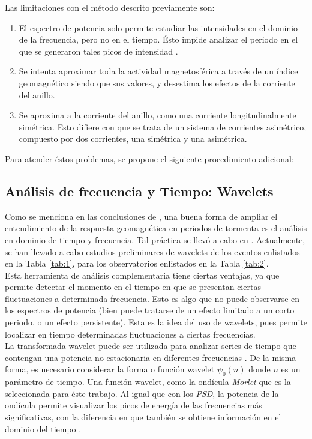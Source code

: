 \documentclass[preprint,12pt]{article}
\begin{document}
Las limitaciones con el método descrito previamente son: 

\begin{enumerate}
	\item El espectro de potencia solo permite estudiar las intensidades en el dominio de la frecuencia, pero no en el tiempo. Ésto impide analizar el periodo en el que se generaron tales picos de intensidad \citep{amory_2021}.
	
	\item Se intenta aproximar toda la actividad magnetosférica a través de un índice geomagnético siendo que sus valores, y desestima los efectos de la corriente del anillo.
	
	\item Se aproxima a la corriente del anillo, como una corriente longitudinalmente simétrica. Esto difiere con que se trata de un sistema de corrientes asimétrico, compuesto por dos corrientes, una simétrica y una asimétrica.		
\end{enumerate}

Para atender éstos problemas, se propone el siguiente procedimiento adicional:

\subsection{Análisis de frecuencia y Tiempo: Wavelets}
\label{SS:2-3}

Como se menciona en las conclusiones de \cite{CASTELLANOSVELAZCO2024106237}, una buena forma de ampliar el entendimiento de la respuesta geomagnética en periodos de tormenta es el análisis en dominio de tiempo y frecuencia. Tal práctica se llevó a cabo en \cite{amory_2021}. Actualmente, se han llevado a cabo estudios preliminares de wavelets de los eventos enlistados en la Tabla \ref{tab:1}, para los observatorios enlistados en la Tabla \ref{tab:2}.\\

Esta herramienta de análisis complementaria tiene ciertas ventajas, ya que permite detectar el momento en el tiempo en que se presentan ciertas fluctuaciones a determinada frecuencia. Esto es algo que no puede observarse en los espectros de potencia (bien puede tratarse de un efecto limitado a un corto periodo, o un efecto persistente). Esta es la idea del uso de wavelets, pues permite localizar en tiempo determinadas fluctuaciones a ciertas frecuencias.\\

La transformada wavelet puede ser utilizada para analizar series de tiempo que contengan una potencia no estacionaria en diferentes frecuencias \citep{guide_wavelet_routines}. De la misma forma, es necesario considerar la forma o función wavelet $\psi_0(n)$ donde $n$ es un parámetro de tiempo. Una función wavelet, como la ondícula \emph{Morlet} que es la seleccionada para éste trabajo. Al igual que con los \emph{PSD}, la potencia de la ondícula permite visualizar los picos de energía de las frecuencias más significativas, con la diferencia en que también se obtiene información en el dominio del tiempo \cite{book_analysis_Method_multiSp_data, guide_wavelet_routines}.
\end{document}
